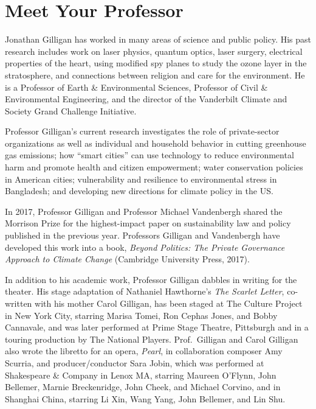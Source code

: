 \clearpage
\section{Meet Your Professor}
Jonathan Gilligan has worked in many areas of science and public policy.
His past research includes work on laser physics, quantum optics,
laser surgery, electrical properties of the heart, using modified spy planes to
study the ozone layer in the stratosphere, and connections between religion and
care for the environment.
He is a Professor of Earth \& Environmental Sciences,
Professor of Civil \& Environmental Engineering,
and the director of the Vanderbilt Climate and Society Grand Challenge
Initiative.
\iffalse

Professor Gilligan joined the Vanderbilt Faculty in 1994 as a member of the
Department of Physics and Astronomy. In 2003, when the Department of Geology
became the Department of Earth and Environmental Science, Professor Gilligan
joined the new department to focus on atmospheric science, global climate change,
and the interactions of politics, ethics, religion, communication, and the
environment.
\fi

Professor Gilligan's current research investigates the role of private-sector
organizations as well as individual and household behavior in cutting
greenhouse gas emissions;
how ``smart cities'' can use technology to reduce environmental harm and
promote health and citizen empowerment;
water conservation policies in American cities;
vulnerability and resilience to environmental stress in Bangladesh;
and developing new directions for climate policy in the US.

In 2017, Professor Gilligan and Professor Michael Vandenbergh shared
the Morrison Prize for the highest-impact paper on sustainability law and
policy published in the previous year. Professors Gilligan and Vandenbergh
have developed this work into a book,
\emph{Beyond Politics: The Private Governance Approach to Climate Change\/}
(Cambridge University Press, 2017).

In addition to his academic work, Professor Gilligan dabbles in writing for the
theater. His stage adaptation of Nathaniel Hawthorne's
\emph{The Scarlet Letter},
co-written with his mother Carol Gilligan, has been staged at The Culture
Project in New York City, starring
Marisa Tomei, Ron Cephas Jones, and Bobby Cannavale, and was later performed
at Prime Stage Theatre, Pittsburgh and in a touring production by The National
Players.
Prof.\ Gilligan and Carol Gilligan also wrote the libretto for an opera,
\emph{Pearl}, in collaboration composer Amy Scurria, and producer/conductor
Sara Jobin, which was performed at Shakespeare \& Company in Lenox MA,
starring Maureen O'Flynn, John Bellemer, Marnie Breckenridge, John Cheek,
and Michael Corvino, and in Shanghai China,
starring Li Xin, Wang Yang, John Bellemer, and Lin Shu.
